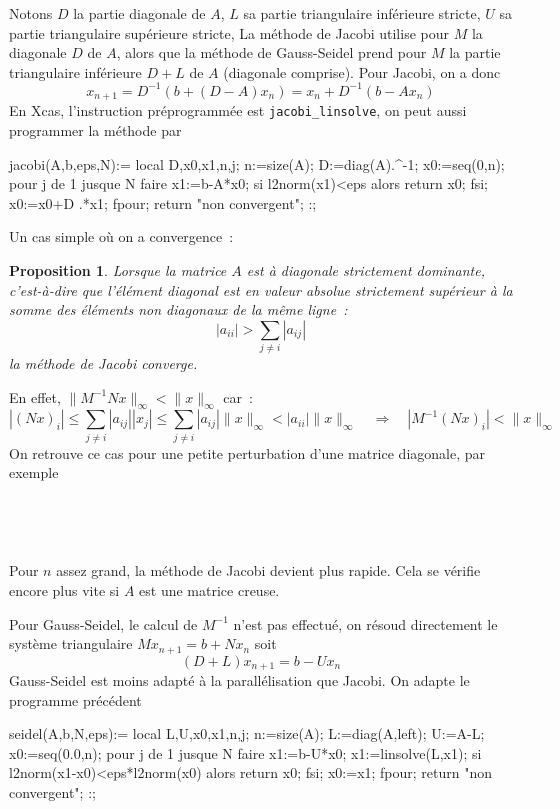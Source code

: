 \documentclass[a4paper,11pt]{article}
\newtheorem{prop}[thm]{Proposition}
\begin{document}
\begin{giacjshere}
Notons $D$ la partie diagonale de $A$,
$L$ sa partie triangulaire inf\'erieure stricte, $U$ sa partie
triangulaire sup\'erieure stricte,
La m\'ethode de Jacobi utilise pour $M$ la
diagonale $D$ de $A$, alors
que la m\'ethode de Gauss-Seidel prend pour $M$ la partie triangulaire
inf\'erieure $D+L$ de $A$ (diagonale comprise). 
Pour Jacobi, on a donc
$$ x_{n+1}=D^{-1}(b+(D-A)x_n)=x_n+D^{-1}(b-Ax_n)$$
En Xcas, l'instruction pr\'eprogramm\'ee est \verb|jacobi_linsolve|, 
on peut aussi programmer la m\'ethode par
\begin{giacprog}
jacobi(A,b,eps,N):={
  local D,x0,x1,n,j;
  n:=size(A);
  D:=diag(A).^-1;
  x0:=seq(0,n);
  pour j de 1 jusque N faire
    x1:=b-A*x0;
    si l2norm(x1)<eps alors return x0; fsi;
    x0:=x0+D .*x1;
  fpour;
  return "non convergent";
}:;
\end{giacprog}
Un cas simple o\`u on a convergence~:
\begin{prop} 
Lorsque la matrice $A$ est
\`a diagonale strictement dominante, c'est-\`a-dire que
l'\'el\'ement diagonal est en valeur absolue strictement sup\'erieur
\`a la somme des \'el\'ements non diagonaux de la m\^eme ligne~:
$$ |a_{ii}| > \sum_{j\neq i} |a_{ij}| $$
la m\'ethode de Jacobi converge.
\end{prop}
En effet,
$\|M^{-1}Nx\|_\infty < \| x\|_\infty$ car~:
$$ |(Nx)_i| \leq \sum_{j \neq i} |a_{ij}| |x_j| \leq \sum_{j \neq i}
|a_{ij}| \|x\|_\infty < |a_{ii}| \| x\|_\infty  
\quad  \Rightarrow \quad |M^{-1}(Nx)_i| <  \| x\|_\infty $$
On retrouve ce cas pour une petite perturbation d'une matrice
diagonale, par exemple~\\
\\
\\
\\
\\
Pour $n$ assez grand, la m\'ethode de Jacobi devient plus rapide. Cela
se v\'erifie encore plus vite si $A$ est une matrice creuse.

Pour Gauss-Seidel,
le calcul de $M^{-1}$ n'est pas effectu\'e, on r\'esoud
directement le syst\`eme triangulaire $Mx_{n+1}=b+Nx_n$ soit
$$ (D+L)x_{n+1}=b-Ux_n$$ 
Gauss-Seidel
est moins adapt\'e \`a la parall\'elisation que Jacobi.
On adapte le programme pr\'ec\'edent
\begin{giacprog}
seidel(A,b,N,eps):={
  local L,U,x0,x1,n,j;
  n:=size(A);
  L:=diag(A,left);
  U:=A-L;
  x0:=seq(0.0,n);
  pour j de 1 jusque N faire
    x1:=b-U*x0;
    x1:=linsolve(L,x1);
    si l2norm(x1-x0)<eps*l2norm(x0) alors return x0; fsi;
    x0:=x1;
  fpour;
  return "non convergent";
}:;
\end{giacprog}


\end{giacjshere}
\end{document}
